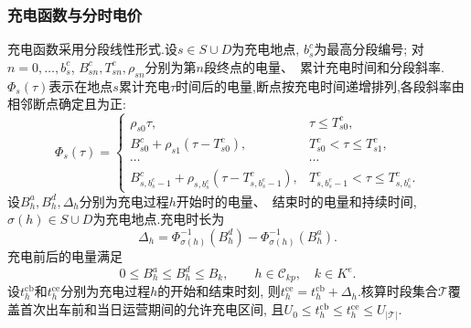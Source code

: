 \documentclass{setp-new}
\begin{document}
\subsubsection{充电函数与分时电价}

充电函数采用分段线性形式\cite{ref:montoya}.设$s\in S\cup D$为充电地点, $b_s^{c}$为最高分段编号;
对$n=0,\ldots,b_s^{c}$, $B_{sn}^{c},T_{sn}^{c},\rho_{sn}$分别为第$n$段终点的电量、~累计充电时间和分段斜率.
$\Phi_s(\tau)$表示在地点$s$累计充电$\tau$时间后的电量,断点按充电时间递增排列,各段斜率由相邻断点确定且为正:
\begin{equation}
\Phi_s(\tau)=
\begin{cases}
\rho_{s0}\tau, & \tau\le T_{s0}^{c},\\
B_{s0}^{c}+\rho_{s1}(\tau-T_{s0}^{c}),
& T_{s0}^{c}<\tau\le T_{s1}^{c},\\
\cdots & \cdots\\
B_{s,b_s^{c}-1}^{c}+\rho_{s,b_s^{c}}(\tau-T_{s,b_s^{c}-1}^{c}),
& T_{s,b_s^{c}-1}^{c}<\tau\le T_{s,b_s^{c}}^{c}.
\end{cases}
\label{eq:unified-charge-function}
\end{equation}
设$B_h^{a},B_h^{d},\Delta_h$分别为充电过程$h$开始时的电量、~结束时的电量和持续时间,
$\sigma(h)\in S\cup D$为充电地点.充电时长为\cite{ref:montoya}
\begin{equation}
\Delta_h=
\Phi_{\sigma(h)}^{-1}(B_h^{d})-
\Phi_{\sigma(h)}^{-1}(B_h^{a}).
\label{eq:unified-charge-duration}
\end{equation}
充电前后的电量满足
\begin{equation}
0\le B_h^{a}\le B_h^{d}\le B_k,
\qquad h\in\mathcal C_{kp},\quad k\in K^{e}.
\label{eq:unified-charge-energy-bound}
\end{equation}
设$t_h^{\mathrm{cb}}$和$t_h^{\mathrm{ce}}$分别为充电过程$h$的开始和结束时刻,
则$t_h^{\mathrm{ce}}=t_h^{\mathrm{cb}}+\Delta_h$.核算时段集合$\mathcal T$覆盖首次出车前和当日运营期间的允许充电区间,
且$U_0\le t_h^{\mathrm{cb}}\le t_h^{\mathrm{ce}}\le U_{|\mathcal T|}$.
\end{document}
